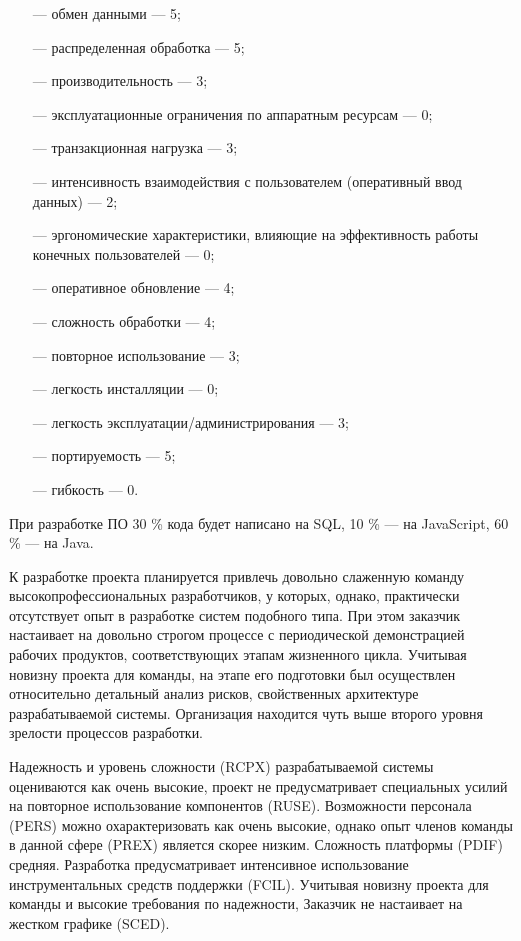 \begin{itemize}
\item[---] обмен данными --- 5;
\item[---] распределенная обработка --- 5;
\item[---] производительность --- 3;
\item[---] эксплуатационные ограничения по аппаратным ресурсам --- 0;
\item[---] транзакционная нагрузка --- 3;
\item[---] интенсивность взаимодействия с пользователем (оперативный ввод
данных) --- 2;
\item[---] эргономические характеристики, влияющие на эффективность работы
конечных пользователей --- 0;
\item[---] оперативное обновление --- 4;
\item[---] сложность обработки --- 4;
\item[---] повторное использование --- 3;
\item[---] легкость инсталляции --- 0;
\item[---] легкость эксплуатации/администрирования --- 3;
\item[---] портируемость --- 5;
\item[---] гибкость --- 0.
\end{itemize}

При разработке ПО 30 \% кода будет написано на SQL, 10 \% --- на JavaScript, 60 \% --- на Java. 

К разработке проекта планируется привлечь довольно слаженную команду высокопрофессиональных разработчиков, у которых, однако, практически отсутствует опыт в разработке систем подобного типа. При этом заказчик настаивает на довольно строгом процессе с периодической демонстрацией рабочих продуктов, соответствующих этапам жизненного цикла. Учитывая новизну проекта для команды, на этапе его подготовки был осуществлен относительно детальный анализ рисков, свойственных архитектуре разрабатываемой системы. Организация находится чуть выше второго уровня зрелости процессов разработки.

Надежность и уровень сложности (RCPX) разрабатываемой системы оцениваются как очень высокие, проект не предусматривает специальных усилий на повторное использование компонентов (RUSE). Возможности персонала (PERS) можно охарактеризовать как очень высокие, однако опыт членов команды в данной сфере (PREX) является скорее низким. Сложность платформы (PDIF) средняя. Разработка предусматривает интенсивное использование инструментальных средств поддержки (FCIL). Учитывая новизну проекта для команды и высокие требования по надежности, Заказчик не настаивает на жестком графике (SCED).